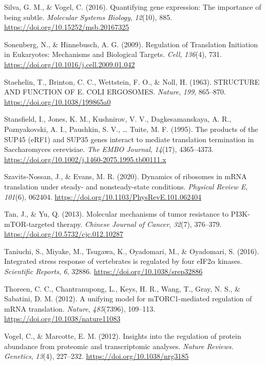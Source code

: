 \documentclass[12pt,openany]{book}
\begin{document}
\hypertarget{ref-Silva2016}{}
Silva, G. M., \& Vogel, C. (2016). Quantifying gene expression: The
importance of being subtle. \emph{Molecular Systems Biology},
\emph{12}(10), 885. \url{https://doi.org/10.15252/msb.20167325}

\hypertarget{ref-Sonenberg2009}{}
Sonenberg, N., \& Hinnebusch, A. G. (2009). Regulation of Translation
Initiation in Eukaryotes: Mechanisms and Biological Targets.
\emph{Cell}, \emph{136}(4), 731.
\url{https://doi.org/10.1016/j.cell.2009.01.042}

\hypertarget{ref-Staehelin1963a}{}
Staehelin, T., Brinton, C. C., Wettstein, F. O., \& Noll, H. (1963).
STRUCTURE AND FUNCTION OF E. COLI ERGOSOMES. \emph{Nature}, \emph{199},
865--870. \url{https://doi.org/10.1038/199865a0}

\hypertarget{ref-Stansfield1995}{}
Stansfield, I., Jones, K. M., Kushnirov, V. V., Dagkesamanskaya, A. R.,
Poznyakovski, A. I., Paushkin, S. V., \ldots{} Tuite, M. F. (1995). The
products of the SUP45 (eRF1) and SUP35 genes interact to mediate
translation termination in Saccharomyces cerevisiae. \emph{The EMBO
Journal}, \emph{14}(17), 4365--4373.
\url{https://doi.org/10.1002/j.1460-2075.1995.tb00111.x}

\hypertarget{ref-Szavits-Nossan2020b}{}
Szavits-Nossan, J., \& Evans, M. R. (2020). Dynamics of ribosomes in
mRNA translation under steady- and nonsteady-state conditions.
\emph{Physical Review E}, \emph{101}(6), 062404.
\url{https://doi.org/10.1103/PhysRevE.101.062404}

\hypertarget{ref-Tan2013}{}
Tan, J., \& Yu, Q. (2013). Molecular mechanisms of tumor resistance to
PI3K-mTOR-targeted therapy. \emph{Chinese Journal of Cancer},
\emph{32}(7), 376--379. \url{https://doi.org/10.5732/cjc.012.10287}

\hypertarget{ref-Taniuchi2016}{}
Taniuchi, S., Miyake, M., Tsugawa, K., Oyadomari, M., \& Oyadomari, S.
(2016). Integrated stress response of vertebrates is regulated by four
eIF2\(\alpha\) kinases. \emph{Scientific Reports}, \emph{6}, 32886.
\url{https://doi.org/10.1038/srep32886}

\hypertarget{ref-Thoreen2012}{}
Thoreen, C. C., Chantranupong, L., Keys, H. R., Wang, T., Gray, N. S.,
\& Sabatini, D. M. (2012). A unifying model for mTORC1-mediated
regulation of mRNA translation. \emph{Nature}, \emph{485}(7396),
109--113. \url{https://doi.org/10.1038/nature11083}

\hypertarget{ref-Vogel2012}{}
Vogel, C., \& Marcotte, E. M. (2012). Insights into the regulation of
protein abundance from proteomic and transcriptomic analyses.
\emph{Nature Reviews. Genetics}, \emph{13}(4), 227--232.
\url{https://doi.org/10.1038/nrg3185}
\end{document}
